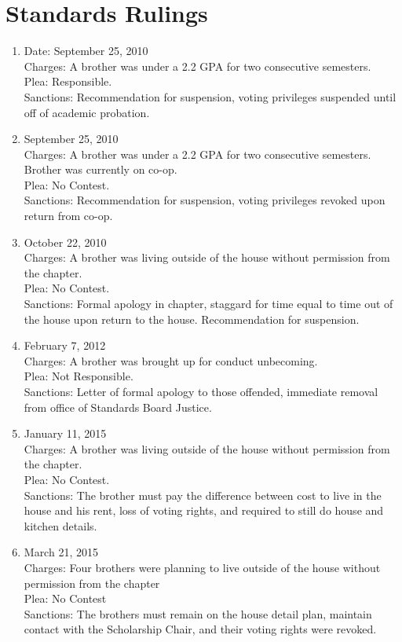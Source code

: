 \chapter{Standards Rulings}
\begin{enumerate}
	\item Date: September 25, 2010\\Charges: A brother was under a 2.2 GPA for two consecutive semesters.\\Plea: Responsible.\\Sanctions: Recommendation for suspension, voting privileges suspended until off of academic probation.
	\item September 25, 2010\\Charges: A brother was under a 2.2 GPA for two consecutive semesters. Brother was currently on co-op.\\Plea: No Contest.\\Sanctions: Recommendation for suspension, voting privileges revoked upon return from co-op.
	\item October 22, 2010\\Charges: A brother was living outside of the house without permission from the chapter.\\Plea: No Contest.\\Sanctions: Formal apology in chapter, \gls{staggard} for time equal to time out of the house upon return to the house. Recommendation for suspension.
	\item February 7, 2012\\Charges: A brother was brought up for conduct unbecoming.\\Plea: Not Responsible.\\Sanctions: Letter of formal apology to those offended, immediate removal from office of Standards Board Justice.
	\item January 11, 2015\\Charges: A brother was living outside of the house without permission from the chapter.\\Plea: No Contest.\\Sanctions: The brother must pay the difference between cost to live in the house and his rent, loss of voting rights, and required to still do house and kitchen details.
	\item March 21, 2015\\Charges: Four brothers were planning to live outside of the house without permission from the chapter\\Plea: No Contest\\Sanctions: The brothers must remain on the house detail plan, maintain contact with the Scholarship Chair, and their voting rights were revoked.

\end{enumerate}
